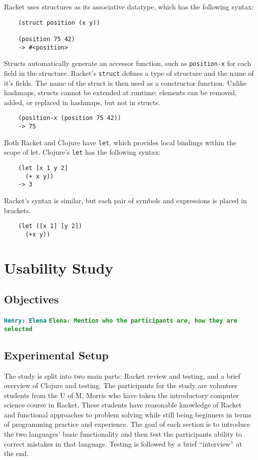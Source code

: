 \documentclass[12pt]{article}
\newcommand{\comment}[1]{{\bf \tt  {#1}}}
\newcommand{\emcomment}[1]{\textcolor{ForestGreen}{\comment{Elena: {#1}}}}
\newcommand{\hfcomment}[1]{\textcolor{Teal}{\comment{Henry: {#1}}}}
\newcommand{\thcomment}[1]{\textcolor{Coquelicot}{\comment{Thomas: {#1}}}}
\begin{document}
Racket uses structures as its associative datatype, which has the following syntax:
\begin{verbatim}
	(struct position (x y))
	
	(position 75 42)
	-> #<position>
\end{verbatim}
Structs automatically generate an accessor function, such as \texttt{position-x} for each field in the structure. Racket's \texttt{struct} defines a type of structure and the name of it's fields. The name of the struct is then used as a constructor function. Unlike hashmaps, structs cannot be extended at runtime; elements can be removed, added, or replaced in hashmaps, but not in structs.
\begin{verbatim}
	(position-x (position 75 42))
	-> 75
\end{verbatim}

Both Racket and Clojure have \texttt{let}, which provides local bindings within the scope of let. Clojure's \texttt{let} has the following syntax:
\begin{verbatim}
	(let [x 1 y 2]
	  (+ x y))
	-> 3
\end{verbatim}
Racket's syntax is similar, but each pair of symbols and expressions is placed in brackets.
\begin{verbatim}
	(let ([x 1] [y 2])
	  (+x y))
\end{verbatim}

\section{Usability Study}\label{sec:study}
	\subsection{Objectives}\label{sec:obj}
	\hfcomment{Elena}
	\emcomment{Mention who the participants are, how they are selected}

	\subsection{Experimental Setup}\label{sec:setup}
	
	   
The study is split into two main parts: Racket review and testing, and a brief overview of Clojure and testing.
The participants for the study are volunteer students from the U of M, Morris who have taken the introductory computer science course in Racket.
These students have reasonable knowledge of Racket and functional approaches to problem solving while still being beginners in terms of programming practice and experience.
The goal of each section is to introduce the two languages' basic functionality and then test the participants ability to correct mistakes in that language.
 Testing is followed by a brief ``interview'' at the end. 
\end{document}
